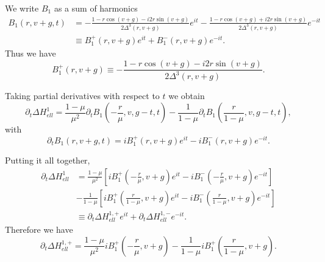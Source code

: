 \documentclass[a4paper]{amsart}
\theoremstyle{remark}
\begin{document}
We write $B_1$ as a sum of harmonics
\begin{align*}
B_1(r,v+g,t) 
   &=-\frac{1-r\cos(v+g)-i2r\sin(v+g)}{2\Delta^3(r,v+g)}e^{it}
-\frac{1-r\cos(v+g)+i2r\sin(v+g)}{2\Delta^3(r,v+g)}e^{-it} \\
   &\equiv B_1^+(r,v+g)e^{it}+B_1^-(r,v+g)e^{-it}.
\end{align*}
Thus we have
\[ B_1^+(r,v+g) \equiv
-\frac{1-r\cos(v+g)-i2r\sin(v+g)}{2\Delta^3(r,v+g)}. \]

Taking partial derivatives with respect to $t$ we obtain
\[ \partial_t \Delta H_{ell}^1 = 
   \frac{1-\mu}{\mu^2} \partial_t B_1(-\frac{r}{\mu},v,g-t,t)
   -\frac{1}{1-\mu} \partial_t B_1(\frac{r}{1-\mu},v,g-t,t), \]
with
\[ \partial_t B_1(r,v+g,t) =
iB_1^+(r,v+g)e^{it}-iB_1^-(r,v+g)e^{-it}.\]

Putting it all together,
\begin{align*} 
\partial_t \Delta H_{ell}^1 
   &= \frac{1-\mu}{\mu^2} 
   \left[ iB_1^+(-\frac{r}{\mu},v+g)e^{it} -
      iB_1^-(-\frac{r}{\mu},v+g)e^{-it} \right] \\
   &-\frac{1}{1-\mu} 
   \left[ iB_1^+(\frac{r}{1-\mu},v+g)e^{it} -
      iB_1^-(\frac{r}{1-\mu},v+g)e^{-it} \right] \\
   &\equiv \partial_t \Delta H_{ell}^{1,+} e^{it} +
      \partial_t \Delta H_{ell}^{1,-} e^{-it}.
\end{align*}
Therefore we have
\[ \partial_t \Delta H_{ell}^{1,+} = 
\frac{1-\mu}{\mu^2} iB_1^+(-\frac{r}{\mu},v+g) -\frac{1}{1-\mu}
iB_1^+(\frac{r}{1-\mu},v+g). \]
\end{document}
